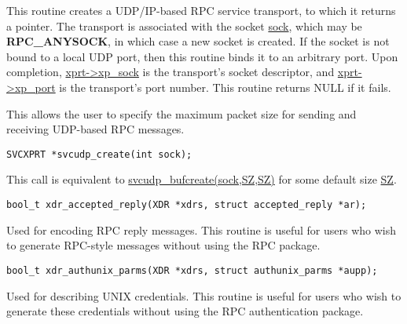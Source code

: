 \documentclass[]{article}
\let\realtextbf=\textbf
\renewcommand{\textbf}[1]{\textcolor{boldcolor}{\realtextbf{#1}}}
\renewcommand{\emph}[1]{\underline{#1}}
\begin{document}
\begin{description}
\itemsep1pt\parskip0pt
\item[]
This routine creates a UDP/IP-based RPC service transport, to which it
returns a pointer. The transport is associated with the socket
\emph{sock}, which may be \textbf{RPC\_ANYSOCK}, in which case a new
socket is created. If the socket is not bound to a local UDP port, then
this routine binds it to an arbitrary port. Upon completion,
\emph{xprt-\textgreater{}xp\_sock} is the transport's socket descriptor,
and \emph{xprt-\textgreater{}xp\_port} is the transport's port number.
This routine returns NULL if it fails.
\end{description}

\begin{description}
\itemsep1pt\parskip0pt
\item[]
This allows the user to specify the maximum packet size for sending and
receiving UDP-based RPC messages.
\end{description}

\begin{verbatim}
SVCXPRT *svcudp_create(int sock);
\end{verbatim}

\begin{description}
\itemsep1pt\parskip0pt
\item[]
This call is equivalent to \emph{svcudp\_bufcreate(sock,SZ,SZ)} for some
default size \emph{SZ}.
\end{description}

\begin{verbatim}
bool_t xdr_accepted_reply(XDR *xdrs, struct accepted_reply *ar);
\end{verbatim}

\begin{description}
\itemsep1pt\parskip0pt
\item[]
Used for encoding RPC reply messages. This routine is useful for users
who wish to generate RPC-style messages without using the RPC package.
\end{description}

\begin{verbatim}
bool_t xdr_authunix_parms(XDR *xdrs, struct authunix_parms *aupp);
\end{verbatim}

\begin{description}
\itemsep1pt\parskip0pt
\item[]
Used for describing UNIX credentials. This routine is useful for users
who wish to generate these credentials without using the RPC
authentication package.
\end{description}
\end{document}
